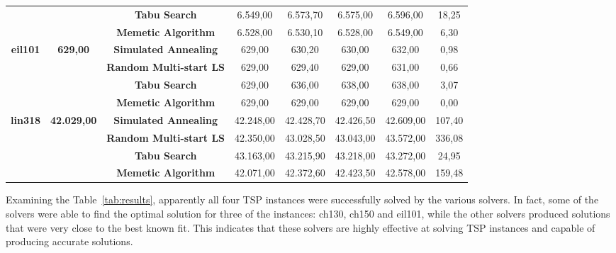 \documentclass[conference]{IEEEtran}
\begin{document}
\begin{table}[H]
{\begin{tabular}{|c|c|c|c|c|c|c|c|}
                &                                     & \textbf{Tabu Search}           & 6.549,00  & 6.573,70  & 6.575,00  & 6.596,00  & 18,25  \\ \cline{3-8}
                &                                     & \textbf{Memetic Algorithm}     & 6.528,00  & 6.530,10  & 6.528,00  & 6.549,00  & 6,30   \\ \hline
                \multirow{4}{*}{\textbf{eil101}} & \multirow{4}{*}{\textbf{629,00}}    & \textbf{Simulated Annealing}   & 629,00    & 630,20    & 630,00    & 632,00    & 0,98   \\ \cline{3-8}
                &                                     & \textbf{Random Multi-start LS} & 629,00    & 629,40    & 629,00    & 631,00    & 0,66   \\ \cline{3-8}
                &                                     & \textbf{Tabu Search}           & 629,00    & 636,00    & 638,00    & 638,00    & 3,07   \\ \cline{3-8}
                &                                     & \textbf{Memetic Algorithm}     & 629,00    & 629,00    & 629,00    & 629,00    & 0,00   \\ \hline
                \multirow{4}{*}{\textbf{lin318}} & \multirow{4}{*}{\textbf{42.029,00}} & \textbf{Simulated Annealing}   & 42.248,00 & 42.428,70 & 42.426,50 & 42.609,00 & 107,40 \\ \cline{3-8}
                &                                     & \textbf{Random Multi-start LS} & 42.350,00 & 43.028,50 & 43.043,00 & 43.572,00 & 336,08 \\ \cline{3-8}
                &                                     & \textbf{Tabu Search}           & 43.163,00 & 43.215,90 & 43.218,00 & 43.272,00 & 24,95  \\ \cline{3-8}
                &                                     & \textbf{Memetic Algorithm}     & 42.071,00 & 42.372,60 & 42.423,50 & 42.578,00 & 159,48 \\ \hline
            \end{tabular}%
        }
    \end{table}

    Examining the Table~\ref{tab:results}, apparently all four TSP instances were successfully solved by the various solvers. In fact, some of the solvers were able to find the optimal solution for three of the instances: ch130, ch150 and eil101, while the other solvers produced solutions that were very close to the best known fit. This indicates that these solvers are highly effective at solving TSP instances and capable of producing accurate solutions.
\end{document}

